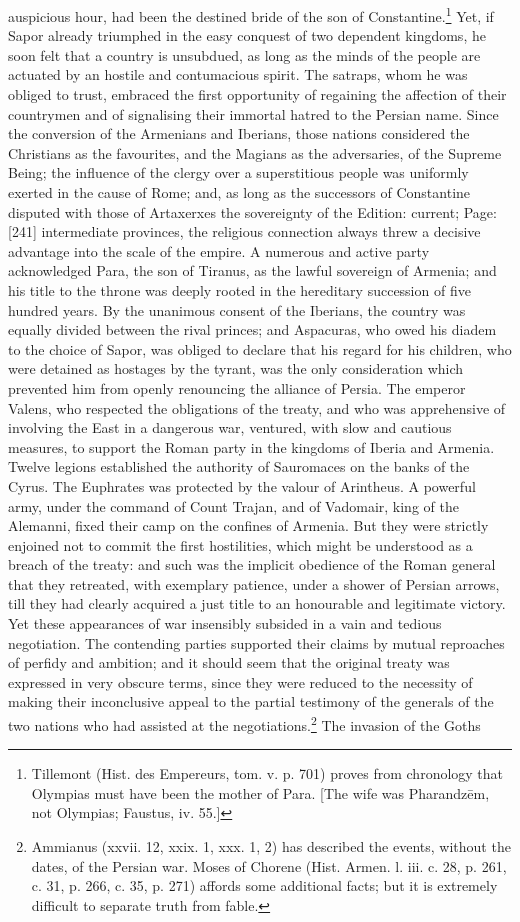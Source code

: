 auspicious hour, had been the destined bride of the son of Constantine.\footnote{Tillemont (Hist. des Empereurs, tom. v. p. 701) proves from chronology that Olympias must have been the mother of Para. [The wife was Pharandzēm, not Olympias; Faustus, iv. 55.]} Yet, if Sapor already triumphed in the easy conquest of two dependent kingdoms, he soon felt that a country is unsubdued, as long as the minds of the people are actuated by an hostile and contumacious spirit. The satraps, whom he was obliged to trust, embraced the first opportunity of regaining the affection of their countrymen and of signalising their immortal hatred to the Persian name. Since the conversion of the Armenians and Iberians, those nations considered the Christians as the favourites, and the Magians as the adversaries, of the Supreme Being; the influence of the clergy over a superstitious people was uniformly exerted in the cause of Rome; and, as long as the successors of Constantine disputed with those of Artaxerxes the sovereignty of the Edition: current; Page: [241] intermediate provinces, the religious connection always threw a decisive advantage into the scale of the empire. A numerous and active party acknowledged Para, the son of Tiranus, as the lawful sovereign of Armenia; and his title to the throne was deeply rooted in the hereditary succession of five hundred years. By the unanimous consent of the Iberians, the country was equally divided between the rival princes; and Aspacuras, who owed his diadem to the choice of Sapor, was obliged to declare that his regard for his children, who were detained as hostages by the tyrant, was the only consideration which prevented him from openly renouncing the alliance of Persia. The emperor Valens, who respected the obligations of the treaty, and who was apprehensive of involving the East in a dangerous war, ventured, with slow and cautious measures, to support the Roman party in the kingdoms of Iberia and Armenia. Twelve legions established the authority of Sauromaces on the banks of the Cyrus. The Euphrates was protected by the valour of Arintheus. A powerful army, under the command of Count Trajan, and of Vadomair, king of the Alemanni, fixed their camp on the confines of Armenia. But they were strictly enjoined not to commit the first hostilities, which might be understood as a breach of the treaty: and such was the implicit obedience of the Roman general that they retreated, with exemplary patience, under a shower of Persian arrows, till they had clearly acquired a just title to an honourable and legitimate victory. Yet these appearances of war insensibly subsided in a vain and tedious negotiation. The contending parties supported their claims by mutual reproaches of perfidy and ambition; and it should seem that the original treaty was expressed in very obscure terms, since they were reduced to the necessity of making their inconclusive appeal to the partial testimony of the generals of the two nations who had assisted at the negotiations.\footnote{Ammianus (xxvii. 12, xxix. 1, xxx. 1, 2) has described the events, without the dates, of the Persian war. Moses of Chorene (Hist. Armen. l. iii. c. 28, p. 261, c. 31, p. 266, c. 35, p. 271) affords some additional facts; but it is extremely difficult to separate truth from fable.} The invasion of the Goths 